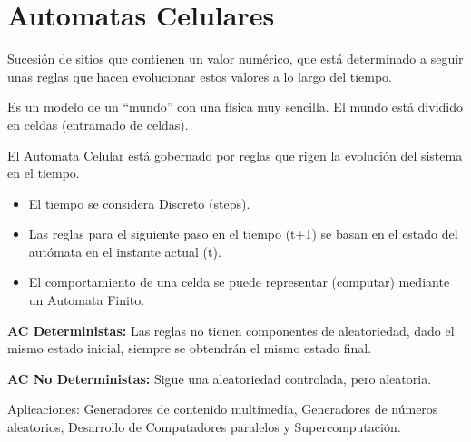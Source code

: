 \section{Automatas Celulares}
Sucesión de sitios que contienen un valor numérico, que está determinado a seguir unas reglas que hacen evolucionar estos valores a lo largo del tiempo.

Es un modelo de un \enquote{mundo} con una física muy sencilla. El mundo está dividido en celdas (entramado de celdas).

El Automata Celular está gobernado por reglas que rigen la evolución del sistema en el tiempo.
\begin{itemize}
	\item El tiempo se considera Discreto (steps).
	\item Las reglas para el siguiente paso en el tiempo (t+1) se basan en el estado del autómata en el instante actual (t).
	\item El comportamiento de una celda se puede representar (computar) mediante un Automata Finito.
\end{itemize}

\textbf{AC Deterministas:} Las reglas no tienen componentes de aleatoriedad, dado el mismo estado inicial, siempre se obtendrán el mismo estado final.

\textbf{AC No Deterministas:} Sigue una aleatoriedad controlada, pero aleatoria.

Aplicaciones: Generadores de contenido multimedia, Generadores de números aleatorios, Desarrollo de Computadores paralelos y Supercomputación.

